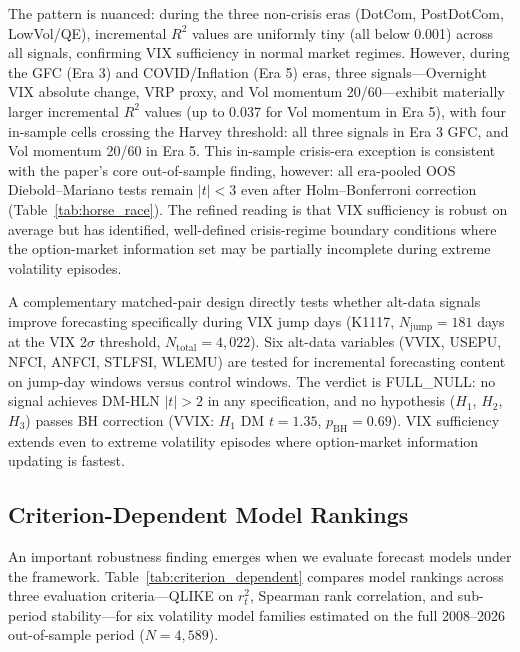 \documentclass[12pt,a4paper]{article}
\begin{document}
The pattern is nuanced: during the three non-crisis eras (DotCom, PostDotCom, LowVol/QE), incremental $R^2$ values are uniformly tiny (all below 0.001) across all signals, confirming VIX sufficiency in normal market regimes. However, during the GFC (Era 3) and COVID/Inflation (Era 5) eras, three signals---Overnight VIX absolute change, VRP proxy, and Vol momentum 20/60---exhibit materially larger incremental $R^2$ values (up to 0.037 for Vol momentum in Era 5), with four in-sample cells crossing the Harvey threshold: all three signals in Era 3 GFC, and Vol momentum 20/60 in Era 5. This in-sample crisis-era exception is consistent with the paper's core out-of-sample finding, however: all era-pooled OOS Diebold--Mariano tests remain $|t|<3$ even after Holm--Bonferroni correction (Table~\ref{tab:horse_race}). The refined reading is that VIX sufficiency is robust on average but has identified, well-defined crisis-regime boundary conditions where the option-market information set may be partially incomplete during extreme volatility episodes.

A complementary matched-pair design directly tests whether alt-data signals improve forecasting specifically during VIX jump days (K1117, $N_{\text{jump}} = 181$ days at the VIX 2$\sigma$ threshold, $N_{\text{total}} = 4{,}022$). Six alt-data variables (VVIX, USEPU, NFCI, ANFCI, STLFSI, WLEMU) are tested for incremental forecasting content on jump-day windows versus control windows. The verdict is FULL\_NULL: no signal achieves DM-HLN $|t|>2$ in any specification, and no hypothesis ($H_1$, $H_2$, $H_3$) passes BH correction (VVIX: $H_1$ DM $t = 1.35$, $p_{\text{BH}} = 0.69$). VIX sufficiency extends even to extreme volatility episodes where option-market information updating is fastest.

\subsection{Criterion-Dependent Model Rankings}
\label{sec:criterion_dependent}

An important robustness finding emerges when we evaluate forecast models under the \citet{patton2011} framework. Table~\ref{tab:criterion_dependent} compares model rankings across three evaluation criteria---QLIKE on $r_t^2$, Spearman rank correlation, and sub-period stability---for six volatility model families estimated on the full 2008--2026 out-of-sample period ($N = 4{,}589$).
\end{document}
